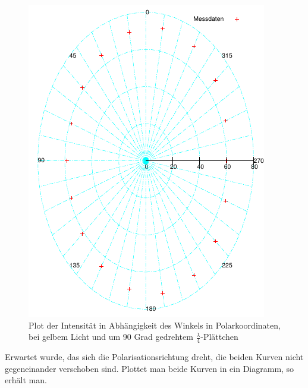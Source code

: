 \documentclass[12pt]{scrartcl}
\begin{document}
\begin{figure}[H]
\centering
    \includegraphics[scale = 1]{a_5_c.pdf}
  	\caption[Plot der Intensität in Abhängigkeit des Winkels in Polarkoordinaten, bei gelbem Licht und um 90 Grad gedrehtem $\frac{\lambda}{4}$-Plättchen]{Plot der Intensität in Abhängigkeit des Winkels in Polarkoordinaten, bei gelbem Licht und um 90 Grad gedrehtem $\frac{\lambda}{4}$-Plättchen}
  \label{fig:a_5_c}
\end{figure}

Erwartet wurde, das sich die Polarisationsrichtung dreht, die beiden Kurven nicht gegeneinander verschoben sind. Plottet man beide Kurven in ein Diagramm, so erhält man.
\end{document}
